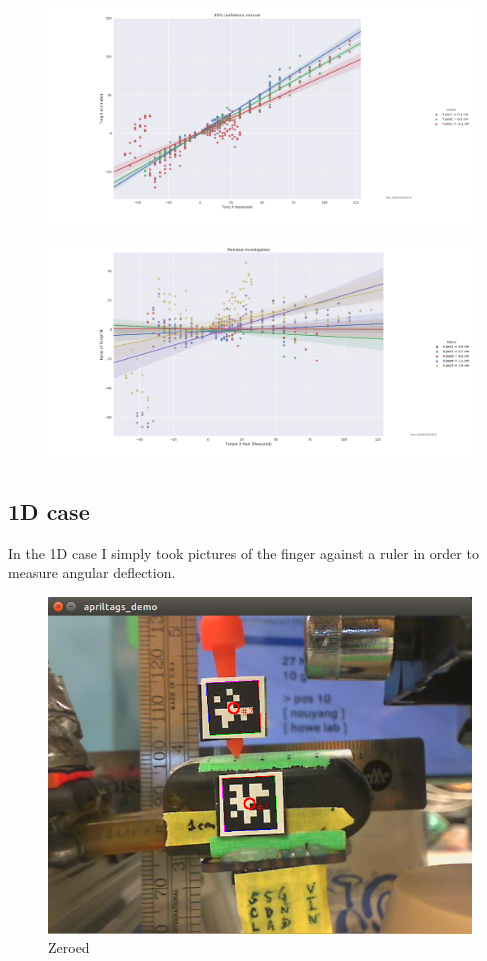 \documentclass[12pt]{article}
\begin{document}
\begin{figure}[H]
\centering
\includegraphics[width=.9\textwidth]{images/round1/TorqX_hueY.png}
\end{figure}


\begin{figure}[H]
\centering
\includegraphics[width=.9\textwidth]{images/round1/ResidX_hueX.png}
\end{figure}


\subsection{1D case}

In the 1D case I simply took pictures of the finger against a ruler in order to measure angular deflection. 

\begin{figure}[H]
\centering
\includegraphics[width=.3\textwidth]{images/1d/zero.png}
\caption{Zeroed}
\end{figure}
\end{document}
